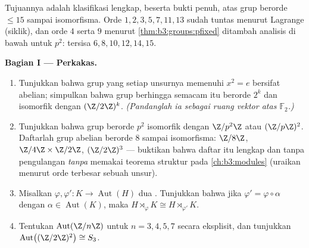 \begin{problem}\label{pb:b3:groups:1}
Tujuannya adalah klasifikasi lengkap, beserta bukti penuh, atas
grup berorde $\leq 15$ sampai isomorfisma. Orde $1, 2, 3, 5,
7, 11, 13$ sudah tuntas menurut Lagrange (siklik), dan orde $4$ serta
$9$ menurut \cref{thm:b3:groups:pfixed} ditambah analisis di bawah untuk
$p^2$: tersisa $6, 8, 10, 12, 14, 15$.

\medskip
\noindent\textbf{Bagian I --- Perkakas.}
\begin{enumerate}
  \item Tunjukkan bahwa grup yang setiap unsurnya memenuhi $x^2 =
        e$ bersifat abelian; simpulkan bahwa grup berhingga semacam itu berorde
        $2^k$ dan isomorfik dengan $(\Z/2\Z)^k$. \emph{(Pandanglah ia sebagai
        ruang vektor atas $\mathbb F_2$.)}
  \item Tunjukkan bahwa grup berorde $p^2$ isomorfik dengan
        $\Z/p^2\Z$ atau $(\Z/p\Z)^2$. Daftarlah grup abelian berorde
        $8$ sampai isomorfisma: $\Z/8\Z$, $\Z/4\Z \times
        \Z/2\Z$, $(\Z/2\Z)^3$ --- buktikan bahwa daftar itu lengkap dan
        tanpa pengulangan \emph{tanpa} memakai teorema struktur pada
        \cref{ch:b3:modules} (uraikan menurut orde terbesar sebuah
        unsur).
  \item Misalkan $\varphi, \varphi' \colon K \to \operatorname{Aut}(H)$
        dua . Tunjukkan bahwa jika $\varphi' = \varphi \circ
        \alpha$ dengan $\alpha \in \operatorname{Aut}(K)$, maka $H
        \rtimes_{\varphi} K \cong H \rtimes_{\varphi'} K$.
  \item Tentukan $\operatorname{Aut}(\Z/n\Z)$ untuk $n = 3, 4, 5,
        7$ secara eksplisit, dan tunjukkan $\operatorname{Aut}\bigl((\Z/2\Z)^2
        \bigr) \cong S_3$.
\end{enumerate}


\end{problem}
